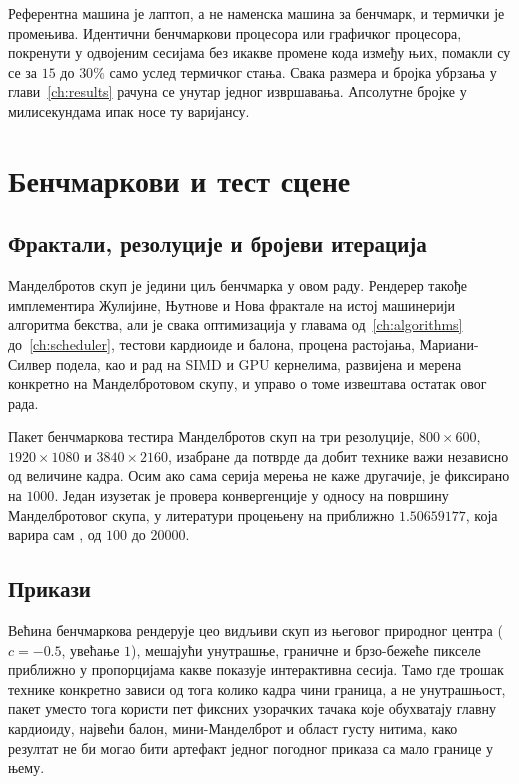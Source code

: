 \documentclass[serbian]{ftndiplomski}
\begin{document}
Референтна машина је лаптоп, а не наменска машина за бенчмарк, и термички је
промењива. Идентични бенчмаркови процесора или графичког процесора, покренути у
одвојеним сесијама без икакве промене кода између њих, помакли су се за $15$ до
$30\%$ само услед термичког стања. Свака размера и бројка убрзања у
глави~\ref{ch:results} рачуна се унутар једног извршавања. Апсолутне бројке у
милисекундама ипак носе ту варијансу.

\section{Бенчмаркови и тест сцене}
\label{sec:benchmarks}

\subsection{Фрактали, резолуције и бројеви итерација}
\label{sec:bench-resolutions}

Манделбротов скуп је једини циљ бенчмарка у овом раду. Рендерер такође имплементира
Жулијине, Њутнове и Нова фрактале на истој машинерији алгоритма бекства, али је свака
оптимизација у главама од~\ref{ch:algorithms} до~\ref{ch:scheduler}, тестови
кардиоиде и балона, процена растојања, Мариани-Силвер подела, као и рад на SIMD и
GPU кернелима, развијена и мерена конкретно на Манделбротовом скупу, и управо о
томе извештава остатак овог рада.

Пакет бенчмаркова тестира Манделбротов скуп на три резолуције, $800\times600$,
$1920\times1080$ и $3840\times2160$, изабране да потврде да добит технике важи
независно од величине кадра. Осим ако сама серија мерења не каже другачије,
 је фиксирано на $1000$. Један изузетак је провера конвергенције у
односу на површину Манделбротовог скупа, у литератури процењену на приближно
$1.50659177$, која варира сам , од $100$ до $20000$.

\subsection{Прикази}
\label{sec:bench-viewports}

Већина бенчмаркова рендерује цео видљиви скуп из његовог природног центра
($c=-0.5$, увећање $1$), мешајући унутрашње, граничне и брзо-бежеће пикселе
приближно у пропорцијама какве показује интерактивна сесија. Тамо где трошак технике
конкретно зависи од тога колико кадра чини граница, а не унутрашњост, пакет уместо
тога користи пет фиксних узорачких тачака које обухватају главну кардиоиду, највећи
балон, мини-Манделброт и област густу нитима, како резултат не би могао бити
артефакт једног погодног приказа са мало границе у њему.
\end{document}
